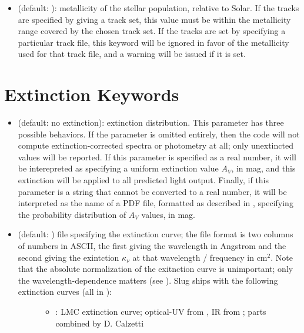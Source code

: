 \documentclass[letterpaper,10pt,english]{sphinxmanual}
\begin{document}
\begin{itemize}
\item {} 
 (default: ): metallicity of the stellar population, relative to Solar. If the tracks are specified by giving a track set, this value must be within the metallicity range covered by the chosen track set. If the tracks are set by specifying a particular track file, this keyword will be ignored in favor of the metallicity used for that track file, and a warning will be issued if it is set.

\end{itemize}


\section{Extinction Keywords}
\label{\detokenize{parameters:extinction-keywords}}\label{\detokenize{parameters:ssec-extinction-keywords}}\begin{itemize}
\item {} 
 (default: no extinction): extinction distribution. This parameter has three possible behaviors. If the parameter  is omitted entirely, then the code will not compute extinction-corrected spectra or photometry at all; only unextincted values will be reported. If this parameter is specified as a real number, it will be interepreted as specifying a uniform extinction value \(A_V\), in mag, and this extinction will be applied to all predicted light output. Finally, if this parameter is a string that cannot be converted to a real number, it will be interpreted as the name of a PDF file, formatted as described in {\hyperref[\detokenize{pdfs:sec-pdfs}]{}}, specifying the probability distribution of \(A_V\) values, in mag.

\item {} \begin{description}
\item[{ (default: ) file specifying the extinction curve; the file format is two columns of numbers in ASCII, the first giving the wavelength in Angstrom and the second giving the exintction \(\kappa_\nu\) at that wavelength / frequency in \(\mathrm{cm}^2\). Note that the absolute normalization of the exitnction curve is unimportant; only the wavelength-dependence matters (see {\hyperref[\detokenize{intro:ssec-spec-phot}]{}}). Slug ships with the following extinction curves (all in ):}] \leavevmode\begin{itemize}
\item {} 
 : LMC extinction curve; optical-UV from , IR from ; parts combined by D. Calzetti


\end{itemize}
\end{description}
\end{itemize}
\end{document}
